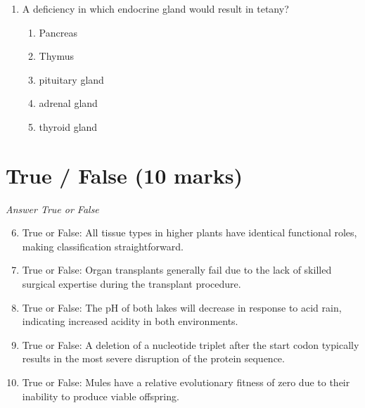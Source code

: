 \documentclass[12pt]{article}
\begin{document}
\begin{enumerate}[label=\arabic*.]
\begin{enumerate}[label=(\alph*)]
    \item are more abundant than most other species in their communities
    \item tend to reduce diversity by eliminating food resources for other species
    \item are the largest species in their communities
    \item are the most aggressive species in their communities
    \item are the only species capable of reproduction
\end{enumerate}
\item A deficiency in which endocrine gland would result in tetany?
\begin{enumerate}[label=(\alph*)]
    \item Pancreas
    \item Thymus
    \item pituitary gland
    \item adrenal gland
    \item thyroid gland
\end{enumerate}
\end{enumerate}

\section*{True / False (10 marks)}
\textit{Answer True or False}
\begin{enumerate}[label=\arabic*.]
\setcounter{enumi}{5}
\item True or False: All tissue types in higher plants have identical functional roles, making classification straightforward.
\item True or False: Organ transplants generally fail due to the lack of skilled surgical expertise during the transplant procedure.
\item True or False: The pH of both lakes will decrease in response to acid rain, indicating increased acidity in both environments.
\item True or False: A deletion of a nucleotide triplet after the start codon typically results in the most severe disruption of the protein sequence.
\item True or False: Mules have a relative evolutionary fitness of zero due to their inability to produce viable offspring.
\end{enumerate}
\end{document}
